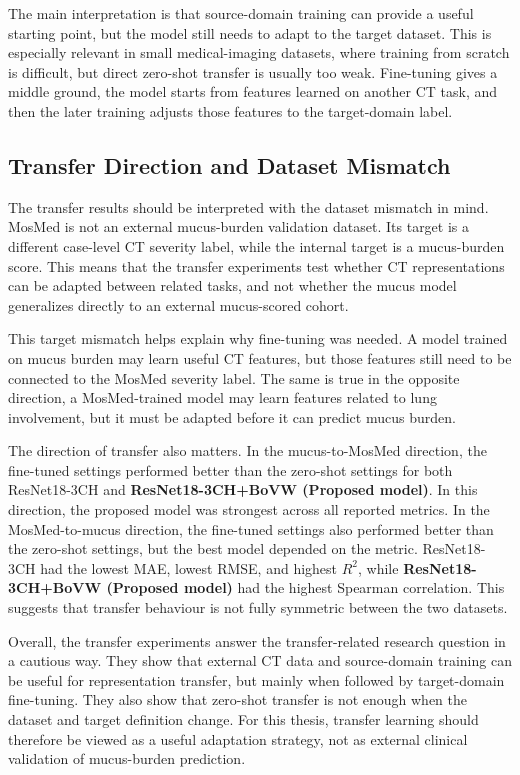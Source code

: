 The main interpretation is that source-domain training can provide a useful starting point, but the model still needs to adapt to the target dataset. This is especially relevant in small medical-imaging datasets, where training from scratch is difficult, but direct zero-shot transfer is usually too weak. Fine-tuning gives a middle ground, the model starts from features learned on another CT task, and then the later training adjusts those features to the target-domain label.


\subsection{Transfer Direction and Dataset Mismatch}
The transfer results should be interpreted with the dataset mismatch in mind. MosMed is not an external mucus-burden validation dataset. Its target is a different case-level CT severity label, while the internal target is a mucus-burden score. This means that the transfer experiments test whether CT representations can be adapted between related tasks, and not whether the mucus model generalizes directly to an external mucus-scored cohort.

This target mismatch helps explain why fine-tuning was needed. A model trained on mucus burden may learn useful CT features, but those features still need to be connected to the MosMed severity label. The same is true in the opposite direction, a MosMed-trained model may learn features related to lung involvement, but it must be adapted before it can predict mucus burden.

The direction of transfer also matters. In the mucus-to-MosMed direction, the fine-tuned settings performed better than the zero-shot settings for both ResNet18-3CH and \textbf{ResNet18-3CH+BoVW (Proposed model)}. In this direction, the proposed model was strongest across all reported metrics. In the MosMed-to-mucus direction, the fine-tuned settings also performed better than the zero-shot settings, but the best model depended on the metric. ResNet18-3CH had the lowest MAE, lowest RMSE, and highest \(R^2\), while \textbf{ResNet18-3CH+BoVW (Proposed model)} had the highest Spearman correlation. This suggests that transfer behaviour is not fully symmetric between the two datasets.

Overall, the transfer experiments answer the transfer-related research question in a cautious way. They show that external CT data and source-domain training can be useful for representation transfer, but mainly when followed by target-domain fine-tuning. They also show that zero-shot transfer is not enough when the dataset and target definition change. For this thesis, transfer learning should therefore be viewed as a useful adaptation strategy, not as external clinical validation of mucus-burden prediction.



